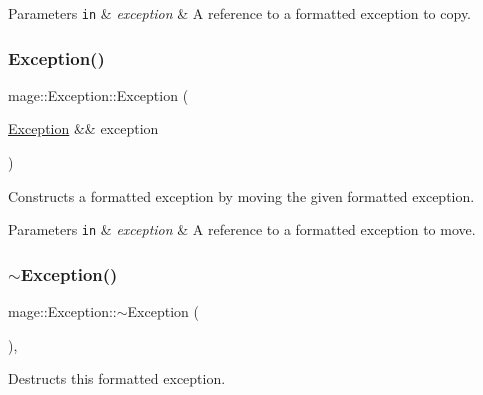 \begin{DoxyParams}[1]{Parameters}
\mbox{\tt in}  & {\em exception} & A reference to a formatted exception to copy. \\
\hline
\end{DoxyParams}
\mbox{\label{classmage_1_1_exception_a5a745eb8921cb986c822c0f95455314a}} 
\subsubsection{\texorpdfstring{Exception()}{Exception()}\hspace{0.1cm}{\footnotesize\ttfamily [4/4]}}
{\footnotesize\ttfamily mage\+::\+Exception\+::\+Exception (\begin{DoxyParamCaption}\item[{\mbox{\hyperlink{classmage_1_1_exception}{Exception}} \&\&}]{exception }\end{DoxyParamCaption})\hspace{0.3cm}{\ttfamily [default]}}

Constructs a formatted exception by moving the given formatted exception.


\begin{DoxyParams}[1]{Parameters}
\mbox{\tt in}  & {\em exception} & A reference to a formatted exception to move. \\
\hline
\end{DoxyParams}
\mbox{\label{classmage_1_1_exception_a088e91ba8dffd31a9d6aa7d4af2ee2c0}} 
\subsubsection{\texorpdfstring{$\sim$\+Exception()}{~Exception()}}
{\footnotesize\ttfamily mage\+::\+Exception\+::$\sim$\+Exception (\begin{DoxyParamCaption}{ }\end{DoxyParamCaption})\hspace{0.3cm}{\ttfamily [virtual]}, {\ttfamily [default]}}

Destructs this formatted exception. 

